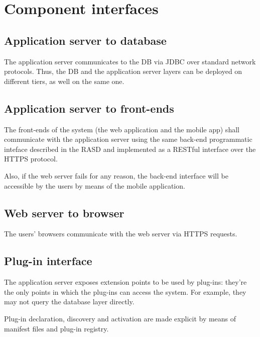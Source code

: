 \section{Component interfaces}
\label{sec:component-interfaces}

\subsection{Application server to database}
The application server communicates to the DB via JDBC over standard network protocols. Thus, the DB and the application server layers can be deployed on different tiers, as well on the same one.

\subsection{Application server to front-ends}
The front-ends of the system (the web application and the mobile app) shall communicate with the application server using the same back-end programmatic inteface described in the RASD and implemented as a RESTful interface over the HTTPS protocol.

Also, if the web server fails for any reason, the back-end interface will be accessible by the users by means of the mobile application.

\subsection{Web server to browser}
The users' browsers communicate with the web server via HTTPS requests.

\subsection{Plug-in interface}
The application server exposes extension points to be used by plug-ins: they're the only points in which the plug-ins can access the system. For example, they may not query the database layer directly.

Plug-in declaration, discovery and activation are made explicit by means of manifest files and plug-in registry.
